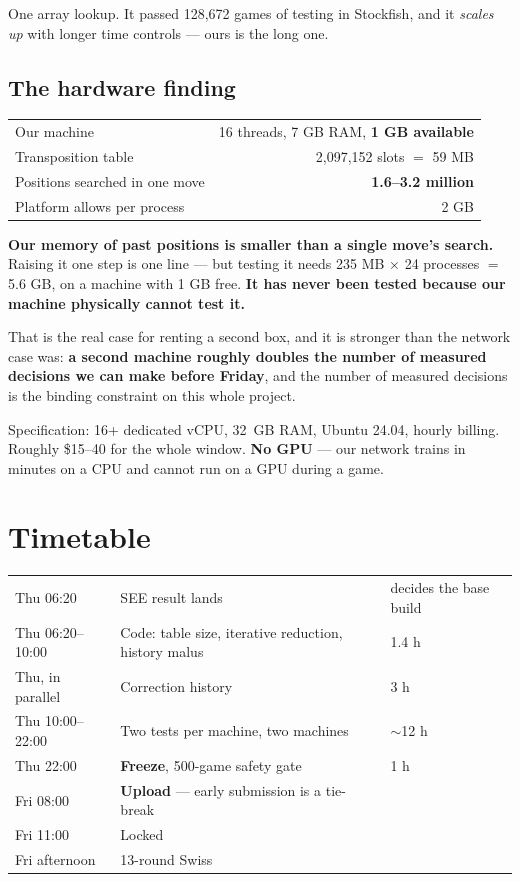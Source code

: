 \documentclass[11pt,a4paper]{article}
\newcommand{\bad}[1]{\textcolor{red!65!black}{\textbf{#1}}}
\begin{document}
One array lookup. It passed 128,672 games of testing in Stockfish, and it \emph{scales up} with
longer time controls --- ours is the long one.

\subsection{The hardware finding}

\begin{center}
\begin{tabular}{lr}
\toprule
Our machine & 16 threads, 7 GB RAM, \bad{1 GB available} \\
Transposition table & 2,097,152 slots $=$ 59 MB \\
Positions searched in one move & \bad{1.6--3.2 million} \\
Platform allows per process & 2 GB \\
\bottomrule
\end{tabular}
\end{center}

\textbf{Our memory of past positions is smaller than a single move's search.} Raising it one step
is one line --- but testing it needs 235 MB $\times$ 24 processes $=$ 5.6 GB, on a machine with
1 GB free. \textbf{It has never been tested because our machine physically cannot test it.}

That is the real case for renting a second box, and it is stronger than the network case was:
\textbf{a second machine roughly doubles the number of measured decisions we can make before
Friday}, and the number of measured decisions is the binding constraint on this whole project.

Specification: 16+ dedicated vCPU, 32~GB RAM, Ubuntu 24.04, hourly billing. Roughly
\$15--40 for the whole window. \textbf{No GPU} --- our network trains in minutes on a CPU and
cannot run on a GPU during a game.

\section{Timetable}

\begin{center}
\begin{tabular}{lll}
\toprule
Thu 06:20 & SEE result lands & decides the base build \\
Thu 06:20--10:00 & Code: table size, iterative reduction, history malus & 1.4 h \\
Thu, in parallel & Correction history & 3 h \\
Thu 10:00--22:00 & Two tests per machine, two machines & $\sim$12 h \\
Thu 22:00 & \textbf{Freeze}, 500-game safety gate & 1 h \\
Fri 08:00 & \textbf{Upload} --- early submission is a tie-break & \\
Fri 11:00 & Locked & \\
Fri afternoon & 13-round Swiss & \\
\bottomrule
\end{tabular}
\end{center}
\end{document}
